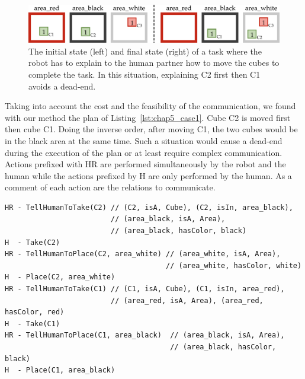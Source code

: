 \begin{figure}[!ht]
\centering
\includegraphics[width=\textwidth]{figures/chapter5/results_case1.png}
\caption{\label{fig:chap5_case1} The initial state (left) and final state (right) of a task where the robot has to explain to the human partner how to move the cubes to complete the task. In this situation, explaining C2 first then C1 avoids a dead-end. }
\end{figure}

Taking into account the cost and the feasibility of the communication, we found with our method the plan of Listing~\ref{lst:chap5_case1}. Cube C2 is moved first then cube C1. Doing the inverse order, after moving C1, the two cubes would be in the black area at the same time. Such a situation would cause a dead-end during the execution of the plan or at least require complex communication. Actions prefixed with HR are performed simultaneously by the robot and the human while the actions prefixed by H are only performed by the human. As a comment of each action are the relations to communicate.

\begin{lstlisting}[frame=single, basicstyle=\scriptsize\ttfamily, label={lst:chap5_case1}, caption={The obtained plan for the first case study where cube C1 must be moved from the red to the black area and cube C2 moved from the black to the white area. The lines beginning with H represent the actions of the human and the lines beginning with HR represent actions involving the human and the robot (communication actions). In green are the \acrshort{reg} results for each communication action.}, captionpos=b, style=HatpPlan]
HR - TellHumanToTake(C2) // (C2, isA, Cube), (C2, isIn, area_black), 
                         // (area_black, isA, Area), 
                         // (area_black, hasColor, black)
H  - Take(C2)
HR - TellHumanToPlace(C2, area_white) // (area_white, isA, Area),
                                      // (area_white, hasColor, white)
H  - Place(C2, area_white)
HR - TellHumanToTake(C1) // (C1, isA, Cube), (C1, isIn, area_red), 
                         // (area_red, isA, Area), (area_red, hasColor, red)
H  - Take(C1)
HR - TellHumanToPlace(C1, area_black)  // (area_black, isA, Area),
                                       // (area_black, hasColor, black)
H  - Place(C1, area_black)
\end{lstlisting}

